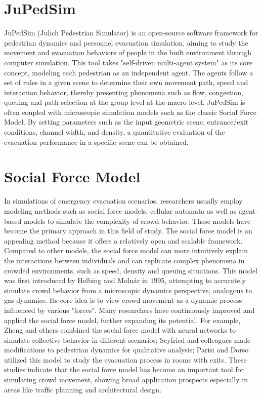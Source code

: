 \section{JuPedSim}
JuPedSim (Julich Pedestrian Simulator) is an open-source software framework for pedestrian dynamics and personnel evacuation simulation, aiming to study the movement and evacuation behaviors of people in the built environment through computer simulation. This tool takes "self-driven multi-agent system" as its core concept, modeling each pedestrian as an independent agent. The agents follow a set of rules in a given scene to determine their own movement path, speed and interaction behavior, thereby presenting phenomena such as flow, congestion, queuing and path selection at the group level at the macro level. JuPedSim is often coupled with microscopic simulation models such as the classic Social Force Model. By setting parameters such as the input geometric scene, entrance/exit conditions, channel width, and density, a quantitative evaluation of the evacuation performance in a specific scene can be obtained.

\section{Social Force Model}
In simulations of emergency evacuation scenarios, researchers usually employ modeling methods such as social force models, cellular automata as well as agent-based models to simulate the complexity of crowd behavior. These models have become the primary approach in this field of study.
The social force model is an appealing method because it offers a relatively open and scalable framework. Compared to other models, the social force model can more intuitively explain the interactions between individuals and can replicate complex phenomena in crowded environments, such as speed, density and queuing situations. This model was first introduced by Helbing and Molnár in 1995, attempting to accurately simulate crowd behavior from a microscopic dynamics perspective, analogous to gas dynamics. Its core idea is to view crowd movement as a dynamic process influenced by various "forces".
Many researchers have continuously improved and applied the social force model, further expanding its potential. For example, Zheng and others combined the social force model with neural networks to simulate collective behavior in different scenarios; Seyfried and colleagues made modifications to pedestrian dynamics for qualitative analysis; Parisi and Dorso utilized this model to study the evacuation process in rooms with exits. These studies indicate that the social force model has become an important tool for simulating crowd movement, showing broad application prospects especially in areas like traffic planning and architectural design.

